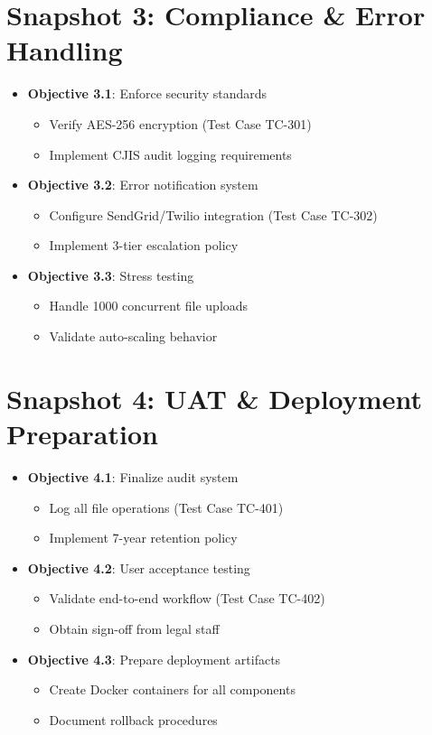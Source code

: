 \documentclass{article}
\begin{document}
\section*{Snapshot 3: Compliance \& Error Handling}
\label{sec:snapshot3}
\begin{itemize}[leftmargin=*]
    \item \textbf{Objective 3.1}: Enforce security standards
    \begin{itemize}
        \item Verify AES-256 encryption (Test Case TC-301)
        \item Implement CJIS audit logging requirements
    \end{itemize}
    
    \item \textbf{Objective 3.2}: Error notification system
    \begin{itemize}
        \item Configure SendGrid/Twilio integration (Test Case TC-302)
        \item Implement 3-tier escalation policy
    \end{itemize}
    
    \item \textbf{Objective 3.3}: Stress testing
    \begin{itemize}
        \item Handle 1000 concurrent file uploads
        \item Validate auto-scaling behavior
    \end{itemize}
\end{itemize}

\section*{Snapshot 4: UAT \& Deployment Preparation}
\label{sec:snapshot4}
\begin{itemize}[leftmargin=*]
    \item \textbf{Objective 4.1}: Finalize audit system
    \begin{itemize}
        \item Log all file operations (Test Case TC-401)
        \item Implement 7-year retention policy
    \end{itemize}
    
    \item \textbf{Objective 4.2}: User acceptance testing
    \begin{itemize}
        \item Validate end-to-end workflow (Test Case TC-402)
        \item Obtain sign-off from legal staff
    \end{itemize}
    
    \item \textbf{Objective 4.3}: Prepare deployment artifacts
    \begin{itemize}
        \item Create Docker containers for all components
        \item Document rollback procedures
    \end{itemize}
\end{itemize}
\end{document}
